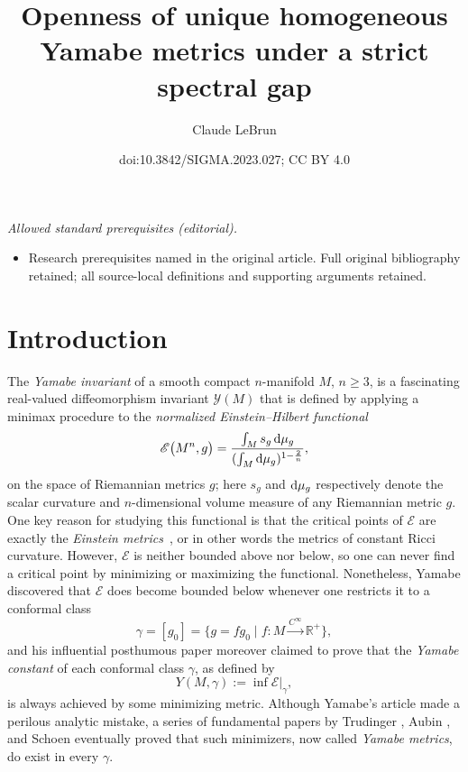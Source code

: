 \documentclass[10pt,a4paper]{amsart}
\title{Openness of unique homogeneous Yamabe metrics under a strict spectral gap}
\author{Claude LeBrun}
\date{doi:10.3842/SIGMA.2023.027; CC BY 4.0}
\numberwithin{equation}{section}
\def\RR{\mathbb{R}}
\let\zap\mathit
\begin{document}
\maketitle
\noindent\textit{Allowed standard prerequisites (editorial).}\begin{itemize}
\item Research prerequisites named in the original article. Full original bibliography retained; all source-local definitions and supporting arguments retained.
\end{itemize}\medskip
\section{Introduction}

The {\em Yamabe invariant} of a smooth compact $n$-manifold $M$, $n\geq 3$, is a
fascinating real-valued diffeomorphism invariant $\mathscr{Y}(M)$ that is defined by applying a minimax procedure to the
{\em normalized Einstein--Hilbert functional}
\begin{equation*}%
\mathscr{E} \big(M^n, g \big) = \frac{\int_M s_g \,{\rm d}\mu_g}{(\int_M {\rm d}\mu_g)^{1-\frac{2}{n}}},
\end{equation*}
on the space of Riemannian metrics $g$; here $s_g$ and ${\rm d}\mu_g$ respectively denote the scalar curvature and
$n$-dimensional volume measure of any Riemannian metric $g$. One key reason
for studying this functional is that the critical points of $\mathscr{E}$ are exactly the {\em Einstein metrics}~\cite{bes},
or in other words the metrics of constant Ricci curvature. However, $\mathscr{E}$ is neither bounded above nor below,
so one can never find a critical point by minimizing or maximizing the functional. Nonetheless, Yamabe discovered that
$\mathscr{E}$ {does} become bounded below whenever one restricts it to a conformal class
\begin{equation*}
\gamma = [g_0]= \big\{ g = {\zap f} g_0 \mid {\zap f}\colon M\stackrel{C^\infty}{\longrightarrow} \RR^+\big\},
\end{equation*}
and his influential posthumous paper \cite{yamabe} moreover claimed to prove
 that the {\em Yamabe constant} of each conformal class $\gamma$, as defined by
 \begin{equation*}
Y(M, \gamma ) := \inf \mathscr{E} |_\gamma ,
\end{equation*}
 is always achieved by some minimizing metric.
 Although Yamabe's article made a perilous analytic mistake, a series of fundamental papers by
Trudinger \cite{trud}, Aubin \cite{aubyam}, and Schoen \cite{rick} eventually proved that such
minimizers, now called {\em Yamabe metrics}, do exist in every $\gamma$.
\end{document}
